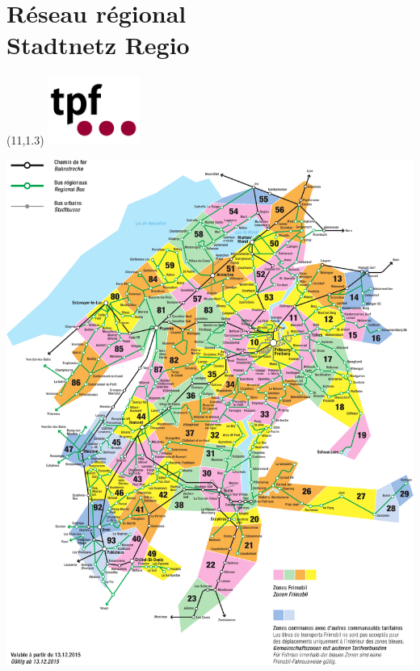 \section*{Réseau régional\\Stadtnetz Regio}
\begin{textblock}{2}(11,1.3)
\includegraphics[width=3cm]{fig/tpf.pdf}
\end{textblock}
\begin{center}
\includegraphics[width=\textwidth]{fig/plan_regional.png}
\end{center}
\clearpage%
\thispagestyle{empty}%
